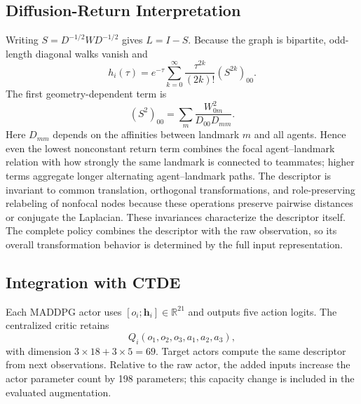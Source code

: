 \documentclass{article}
\newcommand{\R}{\mathbb{R}}
\begin{document}
\subsection{Diffusion-Return Interpretation}
Writing $S=D^{-1/2}WD^{-1/2}$ gives $L=I-S$. Because the graph is bipartite, odd-length diagonal walks vanish and
\begin{equation}
 h_i(\tau)=e^{-\tau}\sum_{k=0}^{\infty}\frac{\tau^{2k}}{(2k)!}(S^{2k})_{00}.
\end{equation}
The first geometry-dependent term is
\begin{equation}
 (S^2)_{00}=\sum_m\frac{W_{0m}^{2}}{D_{00}D_{mm}}.
\end{equation}
Here $D_{mm}$ depends on the affinities between landmark $m$ and all agents. Hence even the lowest nonconstant return term combines the focal agent--landmark relation with how strongly the same landmark is connected to teammates; higher terms aggregate longer alternating agent--landmark paths. The descriptor is invariant to common translation, orthogonal transformations, and role-preserving relabeling of nonfocal nodes because these operations preserve pairwise distances or conjugate the Laplacian. These invariances characterize the descriptor itself. The complete policy combines the descriptor with the raw observation, so its overall transformation behavior is determined by the full input representation.



\subsection{Integration with CTDE}
Each MADDPG actor uses $[o_i;\mathbf{h}_i]\in\R^{21}$ and outputs five action logits. The centralized critic retains
\begin{equation}
 Q_i(o_1,o_2,o_3,a_1,a_2,a_3),
\end{equation}
with dimension $3\times18+3\times5=69$. Target actors compute the same descriptor from next observations. Relative to the raw actor, the added inputs increase the actor parameter count by 198 parameters; this capacity change is included in the evaluated augmentation.



\clearpage
\end{document}
